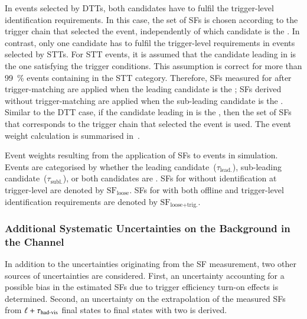 In events selected by DTTs, both \tauhadvis candidates have to fulfil the
trigger-level identification requirements. In this case, the set of SFs is
chosen according to the trigger chain that selected the event, independently of
which \tauhadvis candidate is the \faketauhadvis. In contrast, only one
\tauhadvis candidate has to fulfil the trigger-level requirements in events
selected by STTs. For STT events, it is assumed that the \tauhadvis candidate
leading in \pT is the one satisfying the trigger conditions. This assumption is
correct for more than \SI{99}{\percent} \ttbar events containing \faketauhadvis
in the STT category. Therefore, SFs measured for \faketauhadvis after
trigger-matching are applied when the leading \tauhadvis candidate is the
\faketauhadvis; SFs derived without trigger-matching are applied when the
sub-leading \tauhadvis candidate is the \faketauhadvis. Similar to the DTT case,
if the \tauhadvis candidate leading in \pT is the \faketauhadvis, then the set
of SFs that corresponds to the trigger chain that selected the event is
used. The event weight calculation is summarised
in~.

\begin{table}[htbp]
  \centering

  \caption{Event weights resulting from the application of SFs to \ttbarFakes
    events in simulation. Events are categorised by whether the leading
    \tauhadvis candidate~($\tau_{\text{lead.}}$), sub-leading \tauhadvis
    candidate~($\tau_{\text{subl.}}$), or both \tauhadvis candidates are
    \faketauhadvis. SFs for \faketauhadvis without identification at
    trigger-level are denoted by $\text{SF}_{\text{loose}}$. SFs for
    \faketauhadvis with both offline and trigger-level identification
    requirements are denoted by $\text{SF}_\text{loose+trig.}$.}%
  \label{tab:ttbarSF_application_rule}

  \resizebox{\textwidth}{!}{
    
  }
\end{table}


\subsubsection{Additional Systematic Uncertainties on the \ttbarFakes Background
  in the \hadhad Channel}

In addition to the uncertainties originating from the SF measurement, two other
sources of uncertainties are considered. First, an uncertainty accounting for a
possible bias in the estimated SFs due to trigger efficiency turn-on effects is
determined. Second, an uncertainty on the extrapolation of the measured SFs from
$\ell + \tau_{\text{had-vis}}$ final states to final states with two \tauhadvis is derived.

